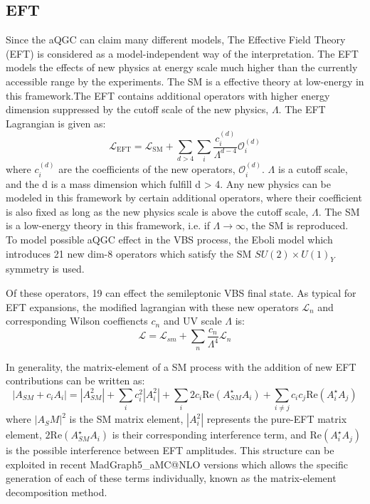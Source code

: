\subsection{EFT}
Since the aQGC can claim many different models, The Effective Field Theory (EFT) is considered as a model-independent way of the interpretation. The EFT models the effects of new physics at energy scale much higher than the currently accessible range by the experiments. The SM is a effective theory at low-energy in this framework.The EFT contains additional operators with higher energy dimension suppressed by the cutoff scale of the new physics, $\Lambda$.
The EFT Lagrangian is given as:
\begin{equation}
\mathcal{L}_{\mathrm{EFT}}=\mathcal{L}_{\mathrm{SM}}+\sum_{d>4} \sum_{i} \frac{c_{i}^{(d)}}{\Lambda^{d-4}} \mathcal{O}_{i}^{(d)}
\end{equation}
where $c_{i}^{(d)}$ are the coefficients of the new operators, $\mathcal{O}_{i}^{(d)}$.
$\Lambda$ is a cutoff scale, and the d is a mass dimension which fulfill d > 4.
Any new physics can be modeled in this framework by certain additional operators, where their coefficient is also fixed as long as the new physics scale is above the cutoff scale, $\Lambda$. The SM is a low-energy theory in this framework, i.e. if $\Lambda \rightarrow \infty$, the SM is reproduced.
\\

To model possible aQGC effect in the VBS process, the Eboli model \cite{eboli2006p} which introduces 21 new dim-8 operators which satisfy the SM $SU(2)\times U(1)_Y$ symmetry is used. 


Of these operators, 19 can effect the semileptonic VBS final state.
As typical for EFT expansions, the modified lagrangian with these new operators $\mathcal{L}_n$ and corresponding Wilson coeffiencts $c_n$ and UV scale $\Lambda$ is:
\begin{equation*}
  \mathcal{L}=\mathcal{L}_{sm}+\sum_{n}\frac{c_n}{\Lambda^{4}}\mathcal{L}_n
\end{equation*}

In generality, the matrix-element of a SM process with the addition of new EFT contributions can be written as:
\begin{equation}
  |A_{SM}+c_iA_i|=|A_{SM}^2|+\sum\limits_i c_i^2|A_{i}^2|+ \sum\limits_i 2 c_i \mathrm{Re}(A_{SM}^\star A_i) +\sum\limits_{i\neq j} c_i c_j \mathrm{Re}(A_i^\star A_j)
\end{equation}
where $|A_SM|^2$ is the SM matrix element, $|A_{i}^2|$ represents the pure-EFT matrix element, $2 \mathrm{Re}(A_{SM}^\star A_i)$ is their corresponding interference term, and $\mathrm{Re}(A_i^\star A_j)$ is the possible interference between EFT amplitudes.
This structure can be exploited in recent MadGraph5\_aMC@NLO versions which allows the specific generation of each of these terms individually, known as the matrix-element decomposition method.

